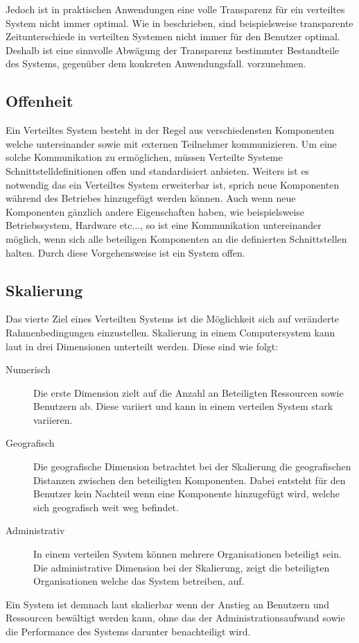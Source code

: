 Jedoch ist in praktischen Anwendungen eine volle Transparenz für ein verteiltes System nicht immer optimal. Wie in \cite{tanenbaum2007distributed} beschrieben, sind beispielsweise transparente Zeitunterschiede in verteilten Systemen nicht immer für den Benutzer optimal. Deshalb ist eine sinnvolle Abwägung der Transparenz bestimmter Bestandteile des Systems, gegenüber dem konkreten Anwendungsfall. vorzunehmen. 

\subsection{Offenheit}\label{sec:distributedSystems:goales:openness} 
Ein Verteiltes System besteht in der Regel aus verschiedensten Komponenten welche untereinander sowie mit externen Teilnehmer kommunizieren. Um eine solche Kommunikation zu ermöglichen, müssen Verteilte Systeme Schnittstelldefinitionen offen und standardisiert anbieten. Weiters ist es notwendig das ein Verteiltes System erweiterbar ist, sprich neue Komponenten während des Betriebes hinzugefügt werden können. Auch wenn neue Komponenten gänzlich andere Eigenschaften haben, wie beispielsweise Betriebssystem, Hardware etc..., so ist eine Kommunikation untereinander möglich, wenn sich alle beteiligen Komponenten an die definierten Schnittstellen halten. Durch diese Vorgehensweise ist ein System offen.  

\subsection{Skalierung}\label{sec:distributedSystems:goales:scalability} 
Das vierte Ziel eines Verteilten Systems ist die Möglichkeit sich auf veränderte Rahmenbedingungen einzustellen. Skalierung in einem Computersystem kann laut \cite{Neuman1993Scale} in drei Dimensionen unterteilt werden. Diese sind wie folgt: 
\begin{description}
    \item[Numerisch] Die erste Dimension zielt auf die Anzahl an Beteiligten Ressourcen sowie Benutzern ab. Diese variiert  und kann in einem verteilen System stark variieren.
    \item[Geografisch] Die geografische Dimension betrachtet bei der Skalierung die geografischen Distanzen zwischen den beteiligten Komponenten. Dabei entsteht für den Benutzer kein Nachteil wenn eine Komponente hinzugefügt wird, welche sich geografisch weit weg befindet.
    \item[Administrativ] In einem verteilen System können mehrere Organisationen beteiligt sein. Die administrative Dimension bei der Skalierung, zeigt die beteiligten Organisationen welche das System betreiben, auf.
\end{description}
Ein System ist demnach laut \cite{Neuman1993Scale} skalierbar wenn der Anstieg an Benutzern und Ressourcen bewältigt werden kann, ohne das der Administrationsaufwand sowie die Performance des Systems darunter benachteiligt wird. \\

